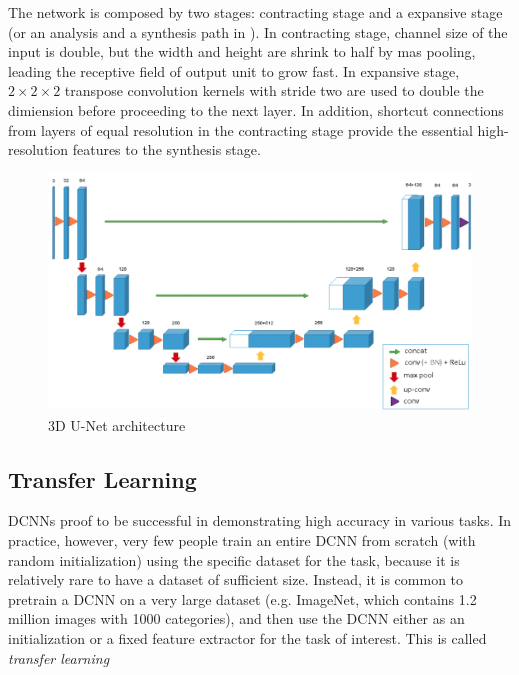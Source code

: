 The network is composed by two stages: contracting stage and a expansive stage (or an analysis and a synthesis path in \cite{iek20163Dunet}). In contracting stage, channel size of the input is double, but the width and height are shrink to half by mas pooling, leading the receptive field of output unit to grow fast. In expansive stage, $2\times2\times2$ transpose convolution kernels with stride two are used to double the dimiension before proceeding to the next layer. In addition, shortcut connections from layers of equal resolution in the contracting stage provide the essential high-resolution features to the synthesis stage.
\begin{figure}
	\centering
	\includegraphics[width=0.7\columnwidth]{figures/ch2/3dunet.png}
	\caption{3D U-Net architecture} 
	\label{fig:ch2-3dunet-architecture}
\end{figure}

\subsection{Transfer Learning}
DCNNs proof to be successful in demonstrating high accuracy in various tasks. In practice, however, very few people train an entire DCNN from scratch (with random initialization) using the specific dataset for the task, because it is relatively rare to have a dataset of sufficient size. Instead, it is common to pretrain a DCNN on a very large dataset (e.g. ImageNet, which contains 1.2 million images with 1000 categories), and then use the DCNN either as an initialization or a fixed feature extractor for the task of interest. This is called \textit{transfer learning} 

